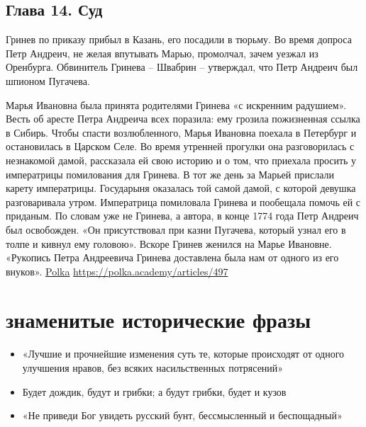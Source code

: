 \documentclass[a4paper,12pt]{article}
\begin{document}
\subsection{Глава 14. Суд}

Гринев по приказу прибыл в Казань, его посадили в тюрьму. Во время допроса Петр Андреич, не желая впутывать Марью, промолчал, зачем уезжал из Оренбурга. Обвинитель Гринева – Швабрин – утверждал, что Петр Андреич был шпионом Пугачева.

Марья Ивановна была принята родителями Гринева «с искренним радушием». Весть об аресте Петра Андреича всех поразила: ему грозила пожизненная ссылка в Сибирь. Чтобы спасти возлюбленного, Марья Ивановна поехала в Петербург и остановилась в Царском Селе. Во время утренней прогулки она разговорилась с незнакомой дамой, рассказала ей свою историю и о том, что приехала просить у императрицы помилования для Гринева.
В тот же день за Марьей прислали карету императрицы. Государыня оказалась той самой дамой, с которой девушка разговаривала утром. Императрица помиловала Гринева и пообещала помочь ей с приданым.
По словам уже не Гринева, а автора, в конце 1774 года Петр Андреич был освобожден. «Он присутствовал при казни Пугачева, который узнал его в толпе и кивнул ему головою». Вскоре Гринев женился на Марье Ивановне. «Рукопись Петра Андреевича Гринева доставлена была нам от одного из его внуков».	
\href{https://polka.academy/articles/497}{Polka}	
\url{https://polka.academy/articles/497}
\cite{lambert1994}

\section{знаменитые исторические фразы}
\begin{itemize}
\item «Лучшие и прочнейшие изменения суть те, которые происходят от одного улучшения нравов, без всяких насильственных потрясений» 
\item Будет дождик, будут и грибки; а будут грибки, будет и кузов
\item «Не приведи Бог увидеть русский бунт, бессмысленный и беспощадный»\cite{Polka}
\end{itemize}













\end{document}
